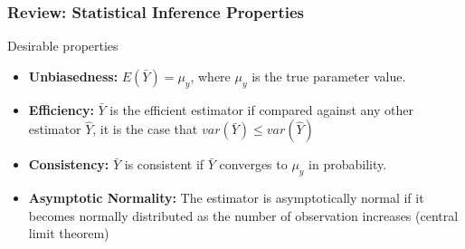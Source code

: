 \documentclass[compress]{beamer}
\begin{document}
\begin{frame}
\frametitle{Review: Statistical Inference Properties}
Desirable properties
\begin{itemize}
\item \textbf{Unbiasedness:} $E(\bar{Y})=\mu_y$, where $\mu_y$ is the true parameter value.
\item \textbf{Efficiency:} $\bar{Y}$ is the efficient estimator if compared against any other estimator $\hat{Y}$, it is the case that $var(\bar{Y})\leq var(\hat{Y})$
\item \textbf{Consistency:} $\bar{Y}$ is consistent if $\bar{Y}$ converges to $\mu_y$ in probability.
\item \textbf{Asymptotic Normality:} The estimator is asymptotically normal if it becomes normally distributed as the number of observation increases (central limit theorem) 
\end{itemize}
\end{frame}
\end{document}
